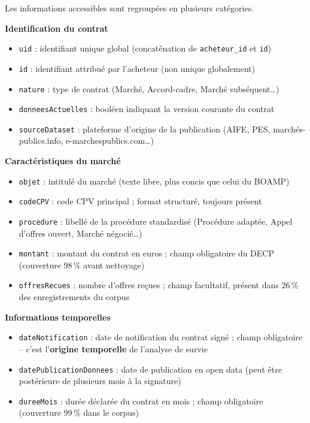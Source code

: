 \documentclass[12pt,a4paper]{article}
\begin{document}
Les informations accessibles sont regroupées en plusieurs catégories.

\medskip
\textbf{Identification du contrat}

\begin{itemize}
  \item[---] \texttt{uid} : identifiant unique global (concaténation de
    \texttt{acheteur\_id} et \texttt{id})
  \item[---] \texttt{id} : identifiant attribué par l'acheteur (non unique
    globalement)
  \item[---] \texttt{nature} : type de contrat (Marché, Accord-cadre, Marché
    subséquent\ldots)
  \item[---] \texttt{donneesActuelles} : booléen indiquant la version courante
    du contrat
  \item[---] \texttt{sourceDataset} : plateforme d'origine de la publication
    (AIFE, PES, marchés-publics.info, e-marchespublics.com\ldots)
\end{itemize}

\medskip
\textbf{Caractéristiques du marché}

\begin{itemize}
  \item[---] \texttt{objet} : intitulé du marché (texte libre, plus concis que
    celui du BOAMP)
  \item[---] \texttt{codeCPV} : code CPV principal ; format structuré, toujours
    présent
  \item[---] \texttt{procedure} : libellé de la procédure standardisé
    (Procédure adaptée, Appel d'offres ouvert, Marché négocié\ldots)
  \item[---] \texttt{montant} : montant du contrat en euros ; champ obligatoire
    du DECP (couverture 98\,\% avant nettoyage)
  \item[---] \texttt{offresRecues} : nombre d'offres reçues ; champ facultatif,
    présent dans 26\,\% des enregistrements du corpus
\end{itemize}

\medskip
\textbf{Informations temporelles}

\begin{itemize}
  \item[---] \texttt{dateNotification} : date de notification du contrat signé ;
    champ obligatoire -- c'est l'\textbf{origine temporelle} de l'analyse de
    survie
  \item[---] \texttt{datePublicationDonnees} : date de publication en
    open data (peut être postérieure de plusieurs mois à la signature)
  \item[---] \texttt{dureeMois} : durée déclarée du contrat en mois ; champ
    obligatoire (couverture 99\,\% dans le corpus)
\end{itemize}
\end{document}
